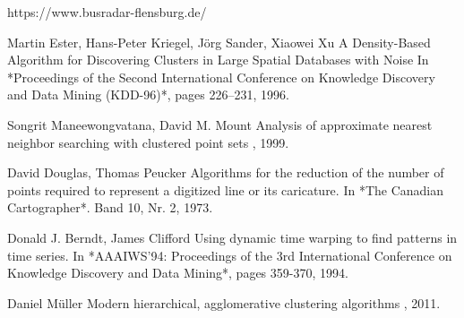 \documentclass[a4paper]{article}
\begin{document}
    
    \begin{thebibliography}{10}

        https://www.busradar-flensburg.de/

        Martin Ester, Hans-Peter Kriegel, Jörg Sander, Xiaowei Xu
        \newblock A Density-Based Algorithm for Discovering Clusters in Large Spatial Databases with Noise
        \newblock In *Proceedings of the Second International Conference on Knowledge Discovery and Data Mining (KDD-96)*, pages 226–231, 1996.

        Songrit Maneewongvatana, David M. Mount
        \newblock Analysis of approximate nearest neighbor searching with clustered point sets
        , 1999.

        David Douglas, Thomas Peucker
        \newblock Algorithms for the reduction of the number of points required to represent a digitized line or its caricature.
        \newblock In *The Canadian Cartographer*. Band 10, Nr. 2, 1973.

        Donald J. Berndt, James Clifford
        \newblock Using dynamic time warping to find patterns in time series.
        \newblock In *AAAIWS'94: Proceedings of the 3rd International Conference on Knowledge Discovery and Data Mining*, pages 359-370, 1994.

        Daniel Müller
        \newblock Modern hierarchical, agglomerative clustering algorithms
        , 2011.

    \end{thebibliography}
\end{document}

